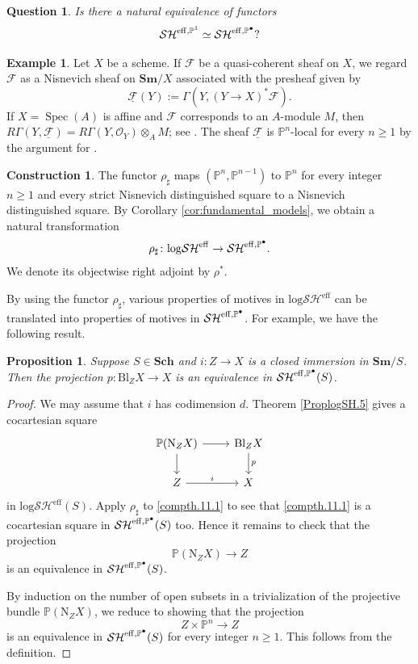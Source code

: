 \documentclass[11pt, a4paper]{amsart}
\newtheorem{prop}[thm]{Proposition}
\newtheorem{ques}[thm]{Question}
\theoremstyle{definition}
\newtheorem{const}[thm]{Construction}
\newtheorem{exm}[thm]{Example}
\numberwithin{equation}{subsection}
\renewcommand{\P}{\mathbb{P}}
\newcommand{\Sch}{\mathbf{Sch}}
\newcommand{\Sm}{\mathbf{Sm}}
\providecommand{\Spec}[1]{\operatorname{Spec}(#1)} 	%
\newcommand{\Blow}{{\mathrm{Bl}}}
\newcommand{\Normal}{{\mathrm{N}}}
\newcommand{\sharpp}{\sharp}
\newcommand{\cF}{\mathcal{F}}
\newcommand{\cO}{\mathcal{O}}
\newcommand{\eff}{{\rm eff}}
\newcommand{\infSHPS}{\mathcal{SH}^{\eff, \P^\bullet}}
\newcommand{\inflogSHS}{\mathrm{log}\mathcal{SH}^{\mathrm{eff}}}
\newcommand{\infSHPoneS}{\mathcal{SH}^{\eff, \mathbb{P}^1}}
\begin{document}
\begin{ques}
\label{compth.5}
Is there a natural equivalence of functors
\[
\infSHPoneS
\simeq
\infSHPS
?
\]
\end{ques}

\begin{exm}
\label{compth.6}
Let $X$ be a scheme.
If $\cF$ be a quasi-coherent sheaf on $X$, we regard $\cF$ as a Nisnevich sheaf on $\Sm/X$ associated with the presheaf given by
\[
\underline{\cF}(Y):=\Gamma(Y,(Y\to X)^*\cF).
\]
If $X=\Spec{A}$ is affine and $\cF$ corresponds to an $A$-module $M$, then $R\Gamma(Y, \underline{\cF}) = R\Gamma(Y, \cO_Y)\otimes_A M$; 
see \cite[\S 3]{AyoubP1loc}. 
The sheaf $\underline{\cF}$ is $\P^n$-local for every $n\geq 1$  
by the argument for \cite[Proposition 3.3]{AyoubP1loc}.
\end{exm}


\begin{const}
\label{compth.4}
The functor $\rho_\sharpp$ maps $(\P^n,\P^{n-1})$ to $\P^n$ for every integer $n\geq 1$ and every strict Nisnevich distinguished square to a Nisnevich distinguished square. By Corollary \ref{cor:fundamental_models},
we obtain a
natural transformation
\[
\rho_\sharpp \colon \inflogSHS \to \infSHPS.
\]
We denote its objectwise right adjoint by $\rho^*$.
\end{const}

By using the functor $\rho_\sharpp$, various properties of motives in $\inflogSHS$ can be translated into properties of motives in $\infSHPS$.
For example, we have the following result.

\begin{prop}
\label{compth.11}
Suppose $S\in \Sch$ and $i\colon Z\to X$ is a closed immersion in $\Sm/S$.
Then the projection $p\colon \Blow_Z X\to X$ is an equivalence in $\infSHPS(S)$.
\end{prop}
\begin{proof}
We may assume that $i$ has codimension $d$.
Theorem \ref{ProplogSH.5} gives a cocartesian square
\begin{equation}
\label{compth.11.1}
\begin{tikzcd}
\P(\Normal_Z X)\ar[r]\ar[d]&
\Blow_Z X\ar[d,"p"]
\\
Z\ar[r,"i"]&
X
\end{tikzcd}
\end{equation}
in $\inflogSHS(S)$.
Apply $\rho_\sharpp$ to \eqref{compth.11.1} to see that \eqref{compth.11.1} is a cocartesian square in $\infSHPS(S)$ too.
Hence it remains to check that the projection
\[
\P(\Normal_Z X)\to Z
\]
is an equivalence in $\infSHPS(S)$.

By induction on the number of open subsets in a trivialization of the projective bundle $\P(\Normal_Z X)$, we reduce to showing that the projection
\[
Z\times \P^n\to Z
\]
is an equivalence in $\infSHPS(S)$ for every integer $n\geq 1$.
This follows from the definition.
\end{proof}
\end{document}
